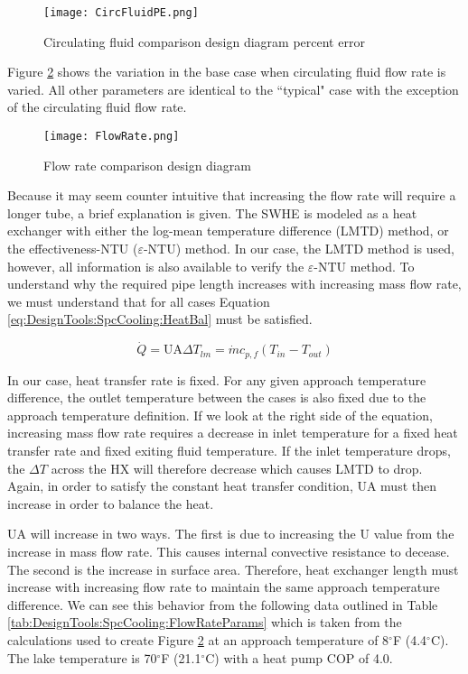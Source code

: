 	\begin{figure}
		\centering
		\texttt{[image: CircFluidPE.png]}
		\caption{Circulating fluid comparison design diagram percent error}
		\label{fig:DesignTools:SpcCooling:CircFluidPE}
	\end{figure}
	
Figure \ref{fig:DesignTools:SpcCooling:FlowRate} shows the variation in the base case when circulating fluid flow rate is varied. All other parameters are identical to the ``typical" case with the exception of the circulating fluid flow rate.

	\begin{figure}
		\centering
		\texttt{[image: FlowRate.png]}
		\caption{Flow rate comparison design diagram}
		\label{fig:DesignTools:SpcCooling:FlowRate}
	\end{figure}
	
Because it may seem counter intuitive that increasing the flow rate will require a longer tube, a brief explanation is given. The SWHE is modeled as a heat exchanger with either the log-mean temperature difference (LMTD) method, or the effectiveness-NTU ($\varepsilon$-NTU) method. In our case, the LMTD method is used, however, all information is also available to verify the $\varepsilon$-NTU method. 
To understand why the required pipe length increases with increasing mass flow rate, we must understand that for all cases Equation \ref{eq:DesignTools:SpcCooling:HeatBal} must be satisfied.

	\begin{equation}
		\dot{Q}=\mbox{UA} \Delta T_{lm} = \dot{m} c_{p,f} (T_{in}-T_{out})
		\label{eq:DesignTools:SpcCooling:HeatBal}
	\end{equation}
	
In our case, heat transfer rate is fixed. For any given approach temperature difference, the outlet temperature between the cases is also fixed due to the approach temperature definition. If we look at the right side of the equation, increasing mass flow rate requires a decrease in inlet temperature for a fixed heat transfer rate and fixed exiting fluid temperature. If the inlet temperature drops, the $\Delta T$ across the HX will therefore decrease which causes LMTD to drop. Again, in order to satisfy the constant heat transfer condition, UA must then increase in order to balance the heat. 

UA will increase in two ways. The first is due to increasing the U value from the increase in mass flow rate. This causes internal convective resistance to decease. The second is the increase in surface area. Therefore, heat exchanger length must increase with increasing flow rate to maintain the same approach temperature difference. We can see this behavior from the following data outlined in Table \ref{tab:DesignTools:SpcCooling:FlowRateParams} which is taken from the calculations used to create Figure \ref{fig:DesignTools:SpcCooling:FlowRate} at an approach temperature of 8$^\circ$F (4.4$^\circ$C). The lake temperature is 70$^\circ$F (21.1$^\circ$C) with a heat pump COP of 4.0.

